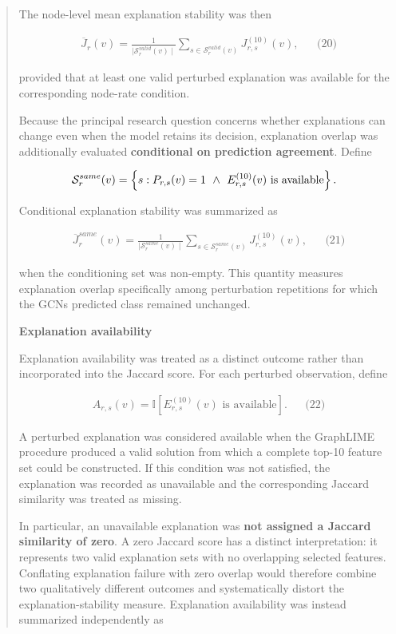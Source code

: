 \documentclass[a4paper]{article}
\begin{document}
\begin{quote}
The node-level mean explanation stability was then

\[\begin{matrix}
 & {\overline{J}}_{r}(v) = \frac{1}{\left. \mid\mathcal{S}_{r}^{valid}(v) \right.\mid}\sum_{s \in \mathcal{S}_{r}^{valid}(v)}^{}J_{r,s}^{(10)}(v), & & \text{(20)}
\end{matrix}
\]

provided that at least one valid perturbed explanation was available for
the corresponding node-rate condition.

Because the principal research question concerns whether explanations
can change even when the model retains its decision, explanation overlap
was additionally evaluated \textbf{conditional on prediction agreement}.
Define

\[\mathcal{S}_{r}^{same}(v) = \left\{ s:P_{r,s}(v) = 1\text{\:\,} \land \text{\:\,}E_{r,s}^{(10)}(v)\text{~is~available} \right\}.
\]

Conditional explanation stability was summarized as

\[\begin{matrix}
 & {\overline{J}}_{r}^{same}(v) = \frac{1}{\left. \mid\mathcal{S}_{r}^{same}(v) \right.\mid}\sum_{s \in \mathcal{S}_{r}^{same}(v)}^{}J_{r,s}^{(10)}(v), & & \text{(21)}
\end{matrix}\]

when the conditioning set was non-empty. This quantity measures
explanation overlap specifically among perturbation repetitions for
which the GCN\textquotesingle s predicted class remained unchanged.

\textbf{Explanation availability}

Explanation availability was treated as a distinct outcome rather than
incorporated into the Jaccard score. For each perturbed observation,
define

\[\begin{matrix}
 & A_{r,s}(v)\mathbb{= I}\left\lbrack E_{r,s}^{(10)}(v)\text{~is~available} \right\rbrack. & & \text{(22)}
\end{matrix}
\]

A perturbed explanation was considered available when the GraphLIME
procedure produced a valid solution from which a complete top-10 feature
set could be constructed. If this condition was not satisfied, the
explanation was recorded as unavailable and the corresponding Jaccard
similarity was treated as missing.

In particular, an unavailable explanation was \textbf{not assigned a
Jaccard similarity of zero}. A zero Jaccard score has a distinct
interpretation: it represents two valid explanation sets with no
overlapping selected features. Conflating explanation failure with zero
overlap would therefore combine two qualitatively different outcomes and
systematically distort the explanation-stability measure. Explanation
availability was instead summarized independently as


\end{quote}
\end{document}
